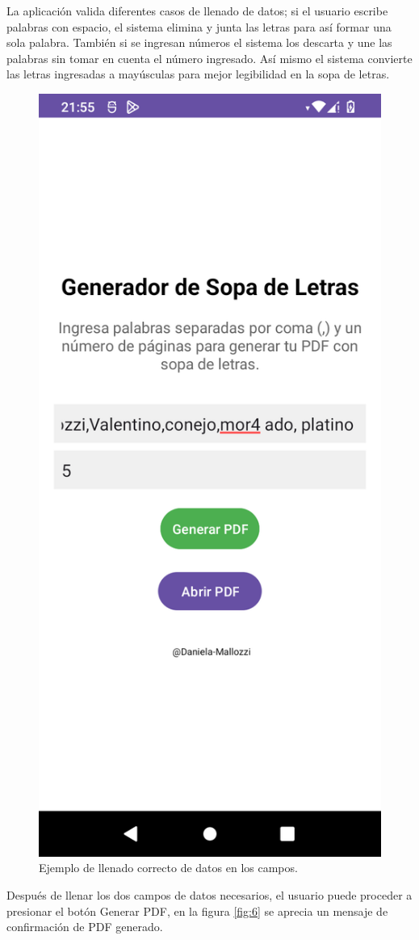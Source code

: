 \documentclass[conference]{IEEEtran}
\begin{document}
La aplicación valida diferentes casos de llenado de datos; si el usuario escribe palabras con espacio, el sistema elimina y junta las letras para así formar una sola palabra. También si se ingresan números el sistema los descarta y une las palabras sin tomar en cuenta el número ingresado. Así mismo el sistema convierte las letras ingresadas a mayúsculas para mejor legibilidad en la sopa de letras.
\begin{figure}[H]
    \centering
    \includegraphics[width=0.4\columnwidth]{imagenes/datos.png}
    \caption{Ejemplo de llenado correcto de datos en los campos.}
    \label{fig:5}
\end{figure}



Después de llenar los dos campos de datos necesarios, el usuario puede proceder a presionar el botón Generar PDF, en la figura \ref{fig:6} se aprecia un mensaje de confirmación de PDF generado.
\end{document}

